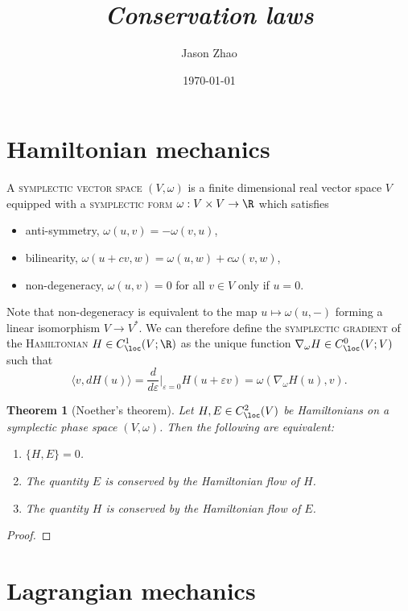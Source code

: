 \documentclass[reqno]{amsart}
\title
{
	\emph{Conservation laws}
}
\author{Jason Zhao}
\date{\today}
\newtheorem{theorem}{Theorem}
\theoremstyle{definition}
\theoremstyle{remark}
\renewcommand{\epsilon}{\varepsilon}
\renewcommand{\emph}{\textsc}
\begin{document}
\maketitle
\tableofcontents

\section{Hamiltonian mechanics}

A \emph{symplectic vector space} $(V, \omega)$ is a finite dimensional real vector space $V$ equipped with a \emph{symplectic form} $\omega : V \times V \to \R$ which satisfies
\begin{itemize}
	\item anti-symmetry, $\omega(u, v) = - \omega(v, u)$,
	\item bilinearity, $\omega(u + cv, w) = \omega(u, w) + c \omega(v, w)$,
	\item non-degeneracy, $\omega(u, v) = 0$ for all $v \in V$ only if $u = 0$. 
\end{itemize}
Note that non-degeneracy is equivalent to the map $u \mapsto \omega(u, -)$ forming a linear isomorphism $V \to V^*$. We can therefore define the \emph{symplectic gradient} of the \emph{Hamiltonian} $H \in C^1_{\loc} (V; \R)$ as the unique function $\nabla_\omega H \in C^0_{\loc} (V; V)$ such that 
	\[ \langle v, dH (u) \rangle = \frac{d}{d\epsilon}\Big|_{\epsilon = 0} H(u + \epsilon v) = \omega(\nabla_\omega H(u), v).  \]

\begin{theorem}[Noether's theorem]
	Let $H, E \in C^2_{\loc} (V)$ be Hamiltonians on a symplectic phase space $(V, \omega)$. Then the following are equivalent:
	\begin{enumerate}
		\item $\{H, E\} = 0$. 
		\item The quantity $E$ is conserved by the Hamiltonian flow of $H$.
		\item The quantity $H$ is conserved by the Hamiltonian flow of $E$. 
	\end{enumerate}
\end{theorem}

\begin{proof}
	
\end{proof}

\section{Lagrangian mechanics}
\end{document}
